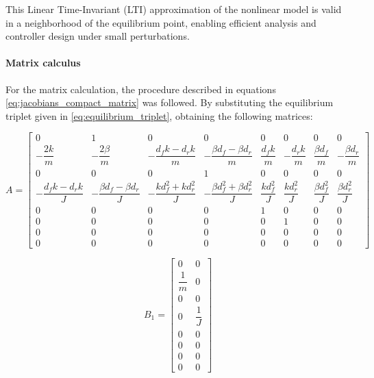 \documentclass[]{report}
\begin{document}
	
	This Linear Time-Invariant (LTI) approximation of the nonlinear model is valid in a neighborhood of the equilibrium point, enabling efficient analysis and controller design under small perturbations.\\
	
	
	\paragraph{Matrix calculus}
	For the matrix calculation, the procedure described in equations \eqref{eq:jacobians_compact_matrix}  was followed. By substituting the equilibrium triplet given in \eqref{eq:equilibrium_triplet}, obtaining the following matrices:
	
\begin{center}
	\begin{equation}
	A =
	\begin{bmatrix}
		0 & 1 & 0 & 0 & 0 & 0 & 0 & 0 \\
		-\dfrac{2k}{m} & -\dfrac{2\beta}{m} & -\dfrac{d_fk - d_rk}{m} & -\dfrac{\beta d_f - \beta d_r}{m} & \dfrac{d_fk}{m} & -\dfrac{d_rk}{m} & \dfrac{\beta d_f}{m} & -\dfrac{\beta d_r}{m} \\
		0 & 0 & 0 & 1 & 0 & 0 & 0 & 0 \\
		-\dfrac{d_fk - d_rk}{J} & -\dfrac{\beta d_f - \beta d_r}{J} & -\dfrac{k d_f^2 + k d_r^2}{J} & -\dfrac{\beta d_f^2 + \beta d_r^2}{J} & \dfrac{k d_f^2}{J} & \dfrac{k d_r^2}{J} & \dfrac{\beta d_f^2}{J} & \dfrac{\beta d_r^2}{J} \\
		0 & 0 & 0 & 0 & 1 & 0 & 0 & 0 \\
		0 & 0 & 0 & 0 & 0 & 1 & 0 & 0 \\
		0 & 0 & 0 & 0 & 0 & 0 & 0 & 0 \\
		0 & 0 & 0 & 0 & 0 & 0 & 0 & 0
	\end{bmatrix}
\end{equation}
\end{center}

	
\begin{equation}
	B_1 =
	\begin{bmatrix}
		0 & 0 \\
		\dfrac{1}{m} & 0 \\
		0 & 0 \\
		0 & \dfrac{1}{J} \\
		0 & 0 \\
		0 & 0 \\
		0 & 0 \\
		0 & 0
	\end{bmatrix}
\end{equation}
\end{document}
